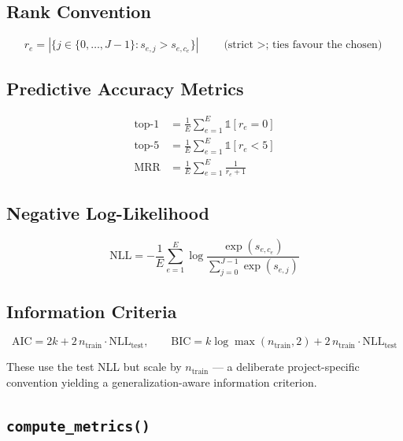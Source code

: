 \documentclass[11pt,a4paper]{article}
\begin{document}
\subsection{Rank Convention}
\[
r_e = |\{j \in \{0, \ldots, J-1\} : s_{e,j} > s_{e,c_e}\}| \qquad \text{(strict $>$; ties favour the chosen)}
\]

\subsection{Predictive Accuracy Metrics}
\begin{align}
\text{top-1} &= \frac{1}{E} \sum_{e=1}^{E} \mathbb{1}[r_e = 0] \\
\text{top-5} &= \frac{1}{E} \sum_{e=1}^{E} \mathbb{1}[r_e < 5] \\
\text{MRR}   &= \frac{1}{E} \sum_{e=1}^{E} \frac{1}{r_e + 1}
\end{align}

\subsection{Negative Log-Likelihood}
\[
\text{NLL} = -\frac{1}{E} \sum_{e=1}^{E} \log \frac{\exp(s_{e,c_e})}{\sum_{j=0}^{J-1} \exp(s_{e,j})}
\]

\subsection{Information Criteria}
\[
\text{AIC} = 2k + 2\,n_{\text{train}} \cdot \text{NLL}_{\text{test}}, \qquad
\text{BIC} = k \log \max(n_{\text{train}}, 2) + 2\,n_{\text{train}} \cdot \text{NLL}_{\text{test}}
\]

These use the test NLL but scale by $n_{\text{train}}$ --- a deliberate project-specific convention yielding a generalization-aware information criterion.

\subsection{\texttt{compute\_metrics()}}
\end{document}
